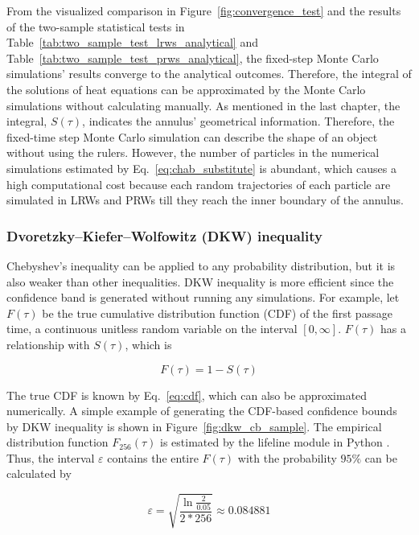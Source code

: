 From the visualized comparison in Figure~\ref{fig:convergence_test}
and the results of the two-sample statistical tests in
Table~\ref{tab:two_sample_test_lrws_analytical} and
Table~\ref{tab:two_sample_test_prws_analytical}, the fixed-step Monte
Carlo simulations' results converge to the analytical
outcomes. Therefore, the integral of the solutions of heat equations
can be approximated by the Monte Carlo simulations without calculating
manually. As mentioned in the last chapter, the integral, $S(\tau)$,
indicates the annulus' geometrical information. Therefore, the
fixed-time step Monte Carlo simulation can describe the shape of an
object without using the rulers. However, the number of particles in
the numerical simulations estimated by Eq.~\ref{eq:chab_substitute} is
abundant, which causes a high computational cost because each random
trajectories of each particle are simulated in LRWs and PRWs till they
reach the inner boundary of the annulus.


\subsubsection{Dvoretzky–Kiefer–Wolfowitz (DKW) inequality}

Chebyshev's inequality can be applied to any probability distribution,
but it is also weaker than other inequalities. DKW inequality is more
efficient since the confidence band is generated without running any
simulations. For example, let $F(\tau)$ be the true cumulative
distribution function (CDF) of the first passage time, a continuous unitless
random variable on the interval $[0, \infty]$. $F(\tau)$ has a
relationship with $S(\tau)$, which is

\begin{equation}\label{eq:cdf}
  F(\tau) = 1 - S(\tau)
\end{equation}

The true CDF is known by Eq.~\ref{eq:cdf}, which can also be approximated
numerically. A simple example of generating the CDF-based confidence
bounds by DKW inequality is shown in Figure~\ref{fig:dkw_cb_sample}. The empirical
distribution function $F_{256}(\tau)$ is estimated by the lifeline
module in Python \cite{davidson2019lifelines}. Thus, the interval
$\varepsilon$ contains the entire $F(\tau)$ with the probability
$95\%$ can be calculated by 

\begin{equation}\label{eq:dkw_cb}
  \varepsilon = \sqrt{\frac{\ln{\frac{2}{0.05}}}{2* 256}} \approx 0.084881
\end{equation}

